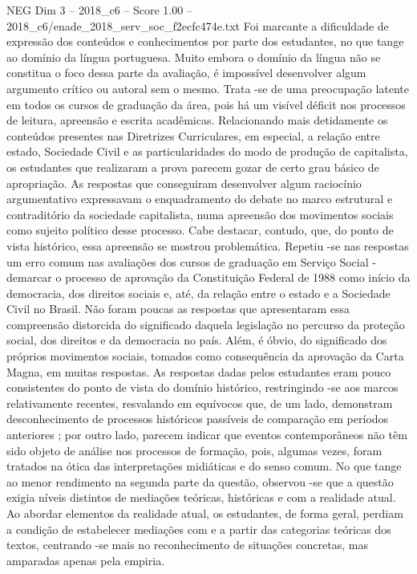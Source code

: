 \begin{textsample}{NEG Dim 3 – 2018\_c6 – Score 1.00 – 2018\_c6/enade\_2018\_serv\_soc\_f2ecfc474e.txt}
Foi marcante a dificuldade de expressão dos conteúdos e conhecimentos por parte dos estudantes, no que tange ao domínio da língua portuguesa.
Muito embora o domínio da língua não se constitua o foco dessa parte da avaliação, é impossível desenvolver algum argumento crítico ou autoral sem o mesmo.
Trata -se de uma preocupação latente em todos os cursos de graduação da área, pois há um visível déficit nos processos de leitura, apreensão e escrita acadêmicas.
Relacionando mais detidamente os conteúdos presentes nas Diretrizes Curriculares, em especial, a relação entre estado, Sociedade Civil e as particularidades do modo de produção de capitalista, os estudantes que realizaram a prova parecem gozar de certo grau básico de apropriação.
As respostas que conseguiram desenvolver algum raciocínio argumentativo expressavam o enquadramento do debate no marco estrutural e contraditório da sociedade capitalista, numa apreensão dos movimentos sociais como sujeito político desse processo.
Cabe destacar, contudo, que, do ponto de vista histórico, essa apreensão se mostrou problemática.
Repetiu -se nas respostas um erro comum nas avaliações dos cursos de graduação em Serviço Social - demarcar o processo de aprovação da Constituição Federal de 1988 como início da democracia, dos direitos sociais e, até, da relação entre o estado e a Sociedade Civil no Brasil.
Não foram poucas as respostas que apresentaram essa compreensão distorcida do significado daquela legislação no percurso da proteção social, dos direitos e da democracia no país.
Além, é óbvio, do significado dos próprios movimentos sociais, tomados como consequência da aprovação da Carta Magna, em muitas respostas.
As respostas dadas pelos estudantes eram pouco consistentes do ponto de vista do domínio histórico, restringindo -se aos marcos relativamente recentes, resvalando em equívocos que, de um lado, demonstram desconhecimento de processos históricos passíveis de comparação em períodos anteriores ; por outro lado, parecem indicar que eventos contemporâneos não têm sido objeto de análise nos processos de formação, pois, algumas vezes, foram tratados na ótica das interpretações midiáticas e do senso comum.
No que tange ao menor rendimento na segunda parte da questão, observou -se que a questão exigia níveis distintos de mediações teóricas, históricas e com a realidade atual.
Ao abordar elementos da realidade atual, os estudantes, de forma geral, perdiam a condição de estabelecer mediações com e a partir das categorias teóricas dos textos, centrando -se mais no reconhecimento de situações concretas, mas amparadas apenas pela empiria.

\end{textsample}
